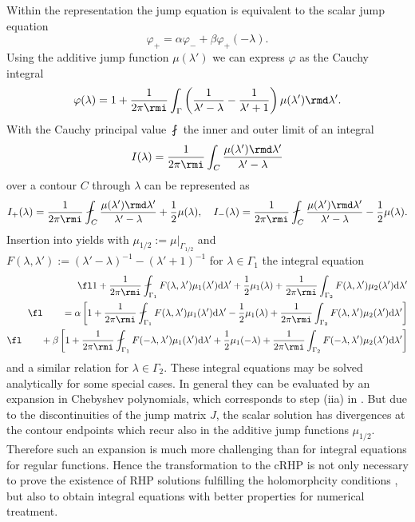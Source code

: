 \documentclass[12pt]{iopart}
\begin{document}
Within the representation  the jump equation  is equivalent to the scalar jump equation
\begin{equation}
\varphi_+=\alpha\varphi_-+\beta\varphi_+(-\lambda). \label{SprungSkalar}
\end{equation}
Using the additive jump function $\mu(\lambda')$ we can express $\varphi$ as the Cauchy integral 
\begin{equation}
\varphi(\lambda)=1+\frac{1}{2\pi \rmi}\int_{\Gamma}\left(\frac{1}{\lambda'-\lambda}-\frac{1}{\lambda'+1}\right)\mu(\lambda')\rmd\lambda'.
\end{equation}
With the Cauchy principal value $\fint$ the inner and outer limit of an integral
\begin{equation}
I(\lambda)=\frac{1}{2\pi \rmi}\int_C\frac{\mu(\lambda')\rmd\lambda'}{\lambda'-\lambda}
\end{equation}
over a contour $C$ through $\lambda$ can be represented as
\begin{equation*}
I_+(\lambda)=\frac{1}{2\pi \rmi}\fint_C\frac{\mu(\lambda')\rmd\lambda'}{\lambda'-\lambda}+\frac{1}{2}\mu(\lambda),\quad 
I_-(\lambda)=\frac{1}{2\pi \rmi}\fint_C\frac{\mu(\lambda')\rmd\lambda'}{\lambda'-\lambda}-\frac{1}{2}\mu(\lambda). %
\end{equation*}
Insertion into  yields with $\mu_{1/2}:=\mu|_{\Gamma_{1/2}}$ and $F(\lambda,\lambda'):=(\lambda'-\lambda)^{-1}-(\lambda'+1)^{-1}$ for $\lambda\in\Gamma_1$ the integral equation
\begin{eqnarray} 
\fl 1+\frac{1}{2\pi \rmi}\fint_{\Gamma_1}F(\lambda,\lambda')\mu_1(\lambda'){\rm d}\lambda'+\frac{1}{2}\mu_1(\lambda)+\frac{1}{2\pi \rmi}\int_{\Gamma_2}F(\lambda,\lambda') \mu_2(\lambda'){\rm d}\lambda' \label{IntGl} \nonumber\\ \fl
\quad\quad =\alpha\left[1+\frac{1}{2\pi \rmi}\fint_{\Gamma_1}F(\lambda,\lambda') \mu_1(\lambda'){\rm d}\lambda'-\frac{1}{2}\mu_1(\lambda)+\frac{1}{2\pi \rmi}\int_{\Gamma_2}F(\lambda,\lambda') \mu_2(\lambda'){\rm d}\lambda'\right] \\ \fl 
\quad\quad+\beta\left[1+\frac{1}{2\pi \rmi}\fint_{\Gamma_1}F(-\lambda,\lambda') \mu_1(\lambda'){\rm d}\lambda'+\frac{1}{2}\mu_1(-\lambda)+\frac{1}{2\pi \rmi}\int_{\Gamma_2}F(-\lambda,\lambda') \mu_2(\lambda'){\rm d}\lambda'\right]  \nonumber
\end{eqnarray}
and a similar relation for $\lambda\in\Gamma_2$. These integral equations may be solved analytically for some special cases. In general they can be evaluated by an expansion in Chebyshev polynomials, which corresponds to step (iia) in . But due to the discontinuities of the jump matrix $J$, the scalar solution has divergences at the contour endpoints which recur also in the additive jump functions $\mu_{1/2}$. Therefore such an expansion is much more challenging than for integral equations for  regular  functions. Hence the transformation to the cRHP is not only necessary to prove the existence of RHP solutions fulfilling the holomorphcity conditions , but also to obtain integral equations with better properties for numerical treatment.
\end{document}
